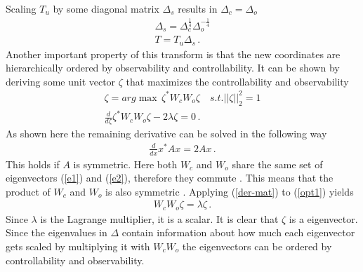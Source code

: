 Scaling \(T_u\) by some diagonal matrix \(\Delta_s\) results in \(\Delta_c = \Delta_o\)
\begin{gather}
\Delta_s = \Delta_c^{\frac{1}{4}}\Delta_o^{-\frac{1}{4}} \\
T = T_u \Delta_s  \,.
\end{gather}
Another important property of this transform is that the new coordinates are hierarchically ordered by observability and controllability.
It can be shown by deriving some unit vector \(\zeta\) that maximizes the controllability and observability
\begin{gather}
\zeta = arg\max \, \zeta^{*}W_cW_o\zeta \quad s.t. ||\zeta||_2^{2} = 1 \\
\frac{d}{d\zeta} \zeta^{*}W_cW_o\zeta - 2\lambda \zeta = 0  \,. \label{opt1}
\end{gather}
As shown here \cite{170373} the remaining derivative can be solved in the following way
\begin{gather}
\frac{d}{dx} x^{*}Ax = 2Ax \,. \label{der-mat}
\end{gather}
This holds if \(A\) is symmetric. 
Here both \(W_c\) and \(W_o\) share the same set of eigenvectors (\ref{e1}) and (\ref{e2}), therefore they commute \cite{170371}.
This means that the product of \(W_c\) and \(W_o\) is also symmetric \cite{170372}.
Applying (\ref{der-mat}) to (\ref{opt1}) yields
\begin{gather}
W_cW_o\zeta = \lambda \zeta \,.
\end{gather}
Since \(\lambda\) is the Lagrange multiplier, it is a scalar. 
It is clear that \(\zeta\) is a eigenvector.
Since the eigenvalues in \(\Delta\) contain information about how much each eigenvector gets scaled by multiplying it with \(W_cW_o\) the eigenvectors can be ordered by controllability and observability.

